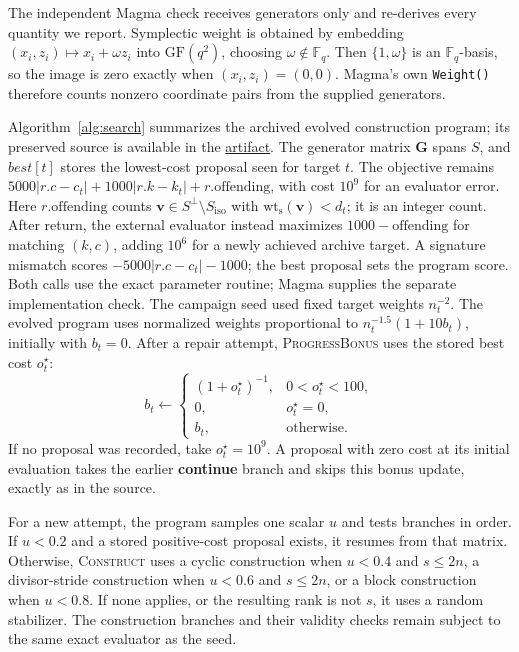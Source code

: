 \documentclass{article}
\newcommand{\F}{\mathbb{F}}
\newcommand{\artifactlink}{\href{https://github.com/LeGenAI/llm_guided_EAQECC_search/tree/arxiv-v1}{artifact}}
\newcommand{\vct}[1]{\boldsymbol{#1}} %
\newcommand{\wt}{\operatorname{wt_s}}
\begin{document}
The independent Magma check receives generators only and re-derives every quantity we
report. Symplectic weight is obtained by embedding
$(x_i,z_i)\mapsto x_i+\omega z_i$ into $\mathrm{GF}(q^2)$, choosing
$\omega\notin\F_q$. Then $\{1,\omega\}$ is an $\F_q$-basis, so the image
is zero exactly when $(x_i,z_i)=(0,0)$. Magma's own \texttt{Weight()}
therefore counts nonzero coordinate pairs from the supplied generators.

Algorithm~\ref{alg:search} summarizes the archived evolved construction
program; its preserved source is available in the
\artifactlink{}.\label{app:construction-program}
The generator matrix $\mathbf{G}$ spans $S$, and $best[t]$ stores the
lowest-cost proposal seen for target $t$. The objective remains
$5000|r.c-c_t|+1000|r.k-k_t|+r.\mathrm{offending}$, with cost $10^9$
for an evaluator error. Here $r.\mathrm{offending}$ counts
$\vct v\in S^\perp\setminus S_{\mathrm{iso}}$ with $\wt(\vct v)<d_t$;
it is an integer count. After return, the external evaluator instead
maximizes $1000-\mathrm{offending}$ for matching $(k,c)$, adding $10^6$
for a newly achieved archive target. A signature mismatch scores
$-5000|r.c-c_t|-1000$; the best proposal sets the program score.
Both calls use the exact parameter routine; Magma supplies the separate
implementation check.
The campaign seed used fixed target weights
$n_t^{-2}$. The evolved program uses normalized weights proportional to
$n_t^{-1.5}(1+10b_t)$, initially with $b_t=0$. After a repair attempt,
\textsc{ProgressBonus} uses the stored best cost $o_t^\star$:
\[
 b_t\gets
 \begin{cases}
  (1+o_t^\star)^{-1},&0<o_t^\star<100,\\
  0,&o_t^\star=0,\\
  b_t,&\text{otherwise}.
 \end{cases}
\]
If no proposal was recorded, take $o_t^\star=10^9$. A proposal with
zero cost at its initial evaluation takes the earlier \textbf{continue}
branch and skips this bonus update, exactly as in the source.

For a new attempt, the program samples one scalar $u$ and tests branches
in order. If $u<0.2$ and a stored positive-cost proposal exists, it resumes
from that matrix. Otherwise, \textsc{Construct} uses a cyclic construction
when $u<0.4$ and $s\le2n$, a divisor-stride construction when $u<0.6$
and $s\le2n$, or a block construction when $u<0.8$. If none applies,
or the resulting rank is not $s$, it uses a random stabilizer.
The construction branches and their validity checks remain subject to the
same exact evaluator as the seed.
\end{document}
